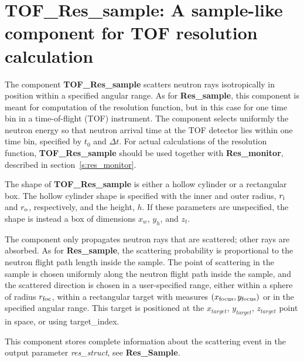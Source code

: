 
\section{TOF\_Res\_sample: A sample-like component for TOF resolution calculation}
\label{s:tof_res_sample}


The component \textbf{TOF\_Res\_sample} scatters neutron rays isotropically
in position within a specified angular range. 
As for {\bf Res\_sample}, this component is meant
for computation of the resolution function, but in this case for one time bin in a
time-of-flight (TOF) instrument. The component selects uniformly the neutron 
energy so that neutron arrival time at the TOF detector lies within one time bin,
specified by $t_0$ and $\Delta t$.
For actual calculations of the resolution
function, {\bf TOF\_Res\_sample} should be used
together with \textbf{Res\_monitor}, described in
section~\ref{s:res_monitor}.

The shape of {\bf TOF\_Res\_sample} is either a hollow cylinder
or a rectangular box. 
The hollow cylinder shape is
specified with the inner and outer radius, $r_{\rm i}$ and $r_{\rm o}$,
respectively, and the height, $h$.
If these parameters are unspecified,
the shape is instead a box of dimensions $x_w$, $y_h$, and $z_t$.

The component only propagates neutron rays that are scattered; 
other rays are absorbed. 
As for {\bf Res\_sample}, the scattering probability is proportional to the neutron
flight path length inside the sample.
The point of scattering in the sample is chosen uniformly
along the neutron flight path inside the sample, and the scattered
direction is chosen in a user-specified range,
either within a sphere of radius $r_{\rm foc}$, within a rectangular
target with measures $(x_{\rm focus}, y_{\rm focus})$
or in the specified angular range. 
This target is positioned at the $x_{target}$, $y_{target}$, $z_{target}$ 
point in space, or using target\_index.

This component stores complete information about the scattering event in the
output parameter \textit{res\_struct}, see {\bf Res\_Sample}. 
